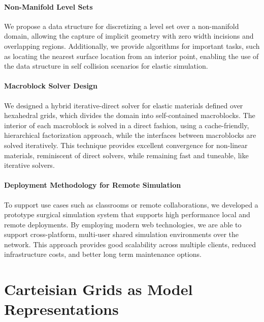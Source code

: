 \paragraph{Non-Manifold Level Sets} We propose a data structure for
discretizing a level set over a non-manifold domain, allowing the
capture of implicit geometry with zero width incisions and overlapping
regions. Additionally, we provide algorithms for important tasks, such
as locating the nearest surface location from an interior point,
enabling the use of the data structure in self collision scenarios for
elastic simulation.

\paragraph{Macroblock Solver Design} We designed a hybrid
iterative-direct solver for elastic materials defined over hexahedral
grids, which divides the domain into self-contained macroblocks. The
interior of each macroblock is solved in a direct fashion, using a
cache-friendly, hierarchical factorization approach, while the
interfaces between macroblocks are solved iteratively. This technique
provides excellent convergence for non-linear materials, reminiscent
of direct solvers, while remaining fast and tuneable, like iterative
solvers.

\paragraph{Deployment Methodology for Remote Simulation} To support
use cases such as classrooms or remote collaborations, we developed a
prototype surgical simulation system that supports high performance
local and remote deployments. By employing modern web technologies, we
are able to support cross-platform, multi-user shared simulation
environments over the network. This approach provides good scalability
across multiple clients, reduced infrastructure costs, and better long
term maintenance options.

\section{Carteisian Grids as Model Representations}

